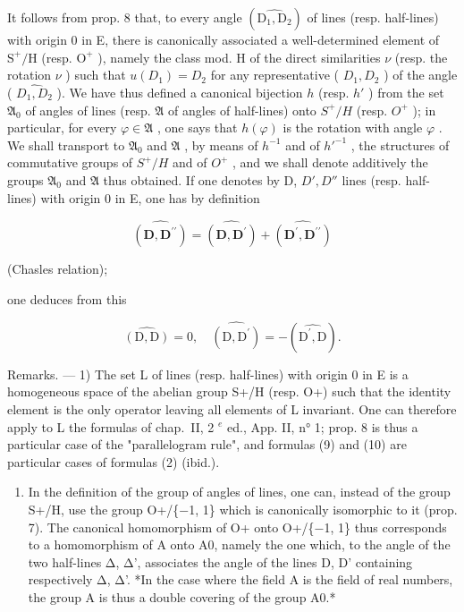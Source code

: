It follows from prop. 8 that, to every angle \((\widehat{\mathrm{D}_1,\mathrm{D}_2})\) of lines (resp. half-lines) with origin 0 in E, there is canonically associated a well-determined element of \(\mathrm{S}^{+}/\mathrm{H}\) (resp. \(\mathrm{O}^{+}\) ), namely the class mod. H of the direct similarities \(\nu\) (resp. the rotation \(\nu\) ) such that \(u(D_1) = D_2\) for any representative ( \(D_1, D_2\) ) of the angle ( \(\widehat{D_1, D_2}\) ). We have thus defined a canonical bijection \(h\) (resp. \(h'\) ) from the set \(\mathfrak{A}_0\) of angles of lines (resp. \(\mathfrak{A}\) of angles of half-lines) onto \(S^+/H\) (resp. \(O^+\) ); in particular, for every \(\varphi \in \mathfrak{A}\) , one says that \(h(\varphi)\) is the rotation with angle \(\varphi\) . We shall transport to \(\mathfrak{A}_0\) and \(\mathfrak{A}\) , by means of \(h^{-1}\) and of \(h'^{-1}\) , the structures of commutative groups of \(S^+/H\) and of \(O^+\) , and we shall denote additively the groups \(\mathfrak{A}_0\) and \(\mathfrak{A}\) thus obtained. If one denotes by D, \(D', D''\) lines (resp. half-lines) with origin 0 in E, one has by definition

\[
\widehat {(\mathbf {D} , \mathbf {D} ^ {\prime \prime})} = \widehat {(\mathbf {D} , \mathbf {D} ^ {\prime})} + \widehat {(\mathbf {D} ^ {\prime} , \mathbf {D} ^ {\prime \prime})}\tag{9}
\]

(Chasles relation);

one deduces from this

\[
\widehat {(\mathrm{D} , \mathrm{D})} = 0, \quad \widehat {(\mathrm{D} , \mathrm{D} ^ {\prime})} = - (\widehat {\mathrm{D} ^ {\prime} , \mathrm{D}}).\tag{10}
\]

Remarks. --- 1) The set L of lines (resp. half-lines) with origin 0 in E is a homogeneous space of the abelian group S+/H (resp. O+) such that the identity element is the only operator leaving all elements of L invariant. One can therefore apply to L the formulas of chap.~II, 2 \(^{e}\) ed., App. II, n° 1; prop. 8 is thus a particular case of the "parallelogram rule", and formulas (9) and (10) are particular cases of formulas (2) (ibid.).

\begin{enumerate}
\def\labelenumi{\arabic{enumi})}
\setcounter{enumi}{1}
\tightlist
\item
  In the definition of the group of angles of lines, one can, instead of the group S+/H, use the group O+/\{−1, 1\} which is canonically isomorphic to it (prop. 7). The canonical homomorphism of O+ onto O+/\{−1, 1\} thus corresponds to a homomorphism of A onto A0, namely the one which, to the angle of the two half-lines Δ, Δ', associates the angle of the lines D, D' containing respectively Δ, Δ'. *In the case where the field A is the field of real numbers, the group A is thus a double covering of the group A0.*
\end{enumerate}

